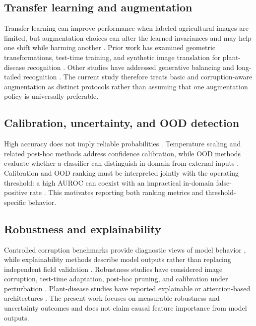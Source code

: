 \documentclass[12pt]{article}
\begin{document}
\subsection{Transfer learning and augmentation}
Transfer learning can improve performance when labeled agricultural images are limited, but augmentation choices can alter the learned invariances and may help one shift while harming another \citep{crossref6,crossref29}. Prior work has examined geometric transformations, test-time training, and synthetic image translation for plant-disease recognition \citep{crossref6,crossref11,crossref36}. Other studies have addressed generative balancing and long-tailed recognition \citep{crossref13,crossref20}. The current study therefore treats basic and corruption-aware augmentation as distinct protocols rather than assuming that one augmentation policy is universally preferable.

\subsection{Calibration, uncertainty, and OOD detection}
High accuracy does not imply reliable probabilities \citep{guo2017}. Temperature scaling and related post-hoc methods address confidence calibration, while OOD methods evaluate whether a classifier can distinguish in-domain from external inputs \citep{liu2020,crossref22}. Calibration and OOD ranking must be interpreted jointly with the operating threshold: a high AUROC can coexist with an impractical in-domain false-positive rate \citep{liu2020,crossref47}. This motivates reporting both ranking metrics and threshold-specific behavior.

\subsection{Robustness and explainability}
Controlled corruption benchmarks provide diagnostic views of model behavior \citep{crossref7}, while explainability methods describe model outputs rather than replacing independent field validation \citep{crossref28,crossref44}. Robustness studies have considered image corruption, test-time adaptation, post-hoc pruning, and calibration under perturbation \citep{crossref7,crossref11,crossref22}. Plant-disease studies have reported explainable or attention-based architectures \citep{crossref28,crossref44}. The present work focuses on measurable robustness and uncertainty outcomes and does not claim causal feature importance from model outputs.
\end{document}
